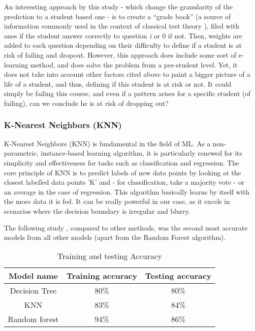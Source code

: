 \documentclass[conference]{IEEEtran}
\begin{document}
An interesting approach by this study \cite{lan_sparse_2014} - which change the granularity of the prediction to a student based one - is to create a “grade book” (a source of information commonly used in the context of classical test theory \cite{novick_axioms_1966}), filed with ones if the student answer correctly to question \textit{i} or 0 if not. Then, weights are added to each question depending on their difficulty to define if a student is at risk of failing and dropout. However, this approach does include some sort of e-learning method, and does solve the problem from a per-student level. Yet, it does not take into account other factors cited above to paint a bigger picture of a life of a student, and thus, defining if this student is at risk or not. It could simply be failing this course, and even if a pattern arises for a specific student (of failing), can we conclude he is at risk of dropping out?

\vspace{8pt}
\subsubsection{K-Nearest Neighbors (KNN)}
K-Nearest Neighbors (KNN) is fundamental in the field of ML. As a non-parametric, instance-based learning algorithm, it is particularly renewed for its simplicity and effectiveness for tasks such as classification and regression.
The core principle of KNN is to predict labels of new data points by looking at the closest labelled data points 'K' and - for classification, take a majority vote - or an average in the case of regression. This algorithm basically learns by itself with the more data it is fed.
It can be really powerful in our case, as it excels in scenarios where the decision boundary is irregular and blurry.

The following study \cite{shiful_machine_2021}, compared to other methods, was the second most accurate models from all other models (apart from the Random Forest algorithm).
\begin{table}[H]
    \centering
    \caption{Training and testing Accuracy\cite{shiful_machine_2021}}
    \begin{tabular}{|c|c|c|}
        \hline
        \textbf{Model name} & \textbf{Training accuracy}  & \textbf{Testing accuracy}\\
        \hline
        Decision Tree & 80\% & 80\% \\
        \hline
        KNN & 83\% & 84\% \\
        \hline
        Random forest & 94\% & 86\% \\
        \hline
    \end{tabular}
    \label{tab:training_testing_acc_shiful}
\end{table}
\end{document}
